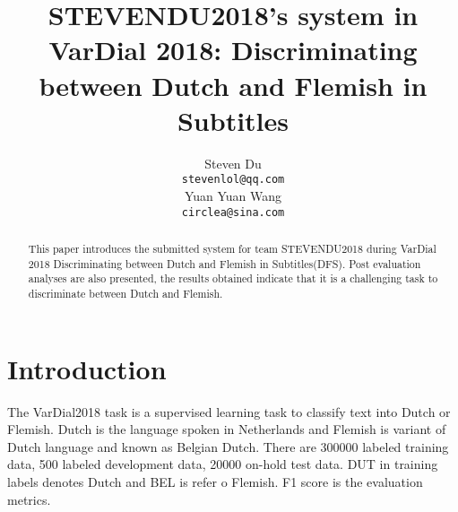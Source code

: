 \documentclass[11pt]{article}
\title{STEVENDU2018's system in VarDial 2018: Discriminating between Dutch and Flemish in Subtitles}
\author{Steven Du \\
	{\tt\footnotesize  stevenlol@qq.com} \\
	\And
	Yuan Yuan Wang \\
	{\tt\footnotesize  circlea@sina.com} 
	}
\date{}
\begin{document}
\maketitle


\begin{abstract}
  This paper introduces the submitted system for team STEVENDU2018 during VarDial 2018 Discriminating between Dutch and Flemish in Subtitles(DFS). Post evaluation analyses are also presented, the results obtained indicate that it is a challenging task to discriminate between Dutch and Flemish.
\end{abstract}


\section{Introduction}
\label{intro}

%
% 
The VarDial2018 task
is a supervised learning task to classify text into Dutch or Flemish. Dutch is the language spoken in Netherlands and Flemish is variant of Dutch language and known as Belgian Dutch. There are 300000 labeled training data, 500 labeled development data, 20000 on-hold test data. DUT in training labels denotes Dutch and BEL is refer o Flemish. F1 score is the evaluation metrics. %
\end{document}
